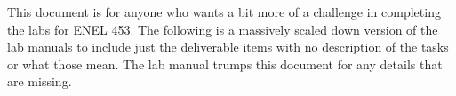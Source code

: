 This document is for anyone who wants a bit more of a challenge in completing the labs for ENEL 453. The following is a massively scaled down version of the lab manuals to include just the deliverable items with no description of the tasks or what those mean. The lab manual trumps this document for any details that are missing. 